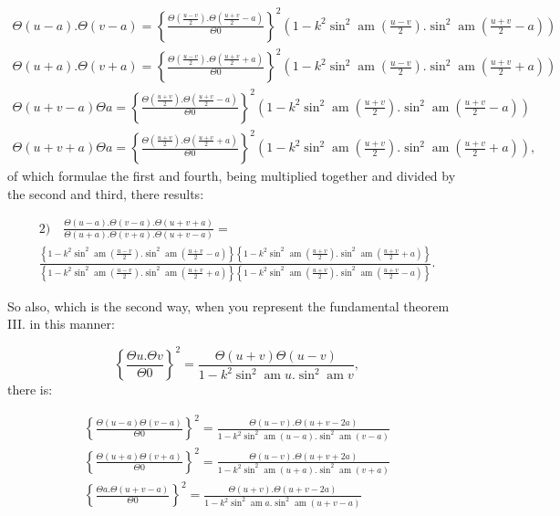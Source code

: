 \documentclass{article}
\begin{document}
\[
\begin{gathered}
\Theta(u-a).\Theta(v-a)=\left\{\frac{\Theta\left(\frac{u-v}{2}\right).\Theta\left(\frac{u+v}{2}-a\right)}{\Theta0}\right\}^{2}\left(1-k^{2}\sin^{2}\operatorname{am}\left(\frac{u-v}{2}\right).\sin^{2}\operatorname{am}\left(\frac{u+v}{2}-a\right)\right)\\[2ex]
\Theta(u+a).\Theta(v+a)=\left\{\frac{\Theta\left(\frac{u-v}{2}\right).\Theta\left(\frac{u+v}{2}+a\right)}{\Theta0}\right\}^{2}\left(1-k^{2}\sin^{2}\operatorname{am}\left(\frac{u-v}{2}\right).\sin^{2}\operatorname{am}\left(\frac{u+v}{2}+a\right)\right)\\[2ex]
\Theta(u+v-a)\Theta a=\left\{\frac{\Theta\left(\frac{u+v}{2}\right).\Theta\left(\frac{u+v}{2}-a\right)}{\Theta0}\right\}^{2}\left(1-k^{2}\sin^{2}\operatorname{am}\left(\frac{u+v}{2}\right).\sin^{2}\operatorname{am}\left(\frac{u+v}{2}-a\right)\right)\\[2ex]
\Theta(u+v+a)\Theta a=\left\{\frac{\Theta\left(\frac{u+v}{2}\right).\Theta\left(\frac{u+v}{2}+a\right)}{\Theta0}\right\}^{2}\left(1-k^{2}\sin^{2}\operatorname{am}\left(\frac{u+v}{2}\right).\sin^{2}\operatorname{am}\left(\frac{u+v}{2}+a\right)\right),
\end{gathered}
\]
of which formulae the first and fourth, being multiplied together and divided by the second and third, there results:

\[
\begin{gathered}
\text{2)}\quad \frac{\Theta(u-a).\Theta(v-a).\Theta(u+v+a)}{\Theta(u+a).\Theta(v+a).\Theta(u+v-a)}=\\[1.5ex]
\frac{\left\{1-k^{2}\sin^{2}\operatorname{am}\left(\frac{u-v}{2}\right).\sin^{2}\operatorname{am}\left(\frac{u+v}{2}-a\right)\right\}\left\{1-k^{2}\sin^{2}\operatorname{am}\left(\frac{u+v}{2}\right).\sin^{2}\operatorname{am}\left(\frac{u+v}{2}+a\right)\right\}}{\left\{1-k^{2}\sin^{2}\operatorname{am}\left(\frac{u-v}{2}\right).\sin^{2}\operatorname{am}\left(\frac{u+v}{2}+a\right)\right\}\left\{1-k^{2}\sin^{2}\operatorname{am}\left(\frac{u+v}{2}\right).\sin^{2}\operatorname{am}\left(\frac{u+v}{2}-a\right)\right\}}.
\end{gathered}
\]

So also, which is the second way, when you represent the fundamental theorem III. in this manner:

\[
\left\{\frac{\Theta u.\Theta v}{\Theta0}\right\}^{2}=\frac{\Theta(u+v)\Theta(u-v)}{1-k^{2}\sin^{2}\operatorname{am}u.\sin^{2}\operatorname{am}v},
\]
there is:

\[
\begin{gathered}
\left\{\frac{\Theta(u-a)\Theta(v-a)}{\Theta0}\right\}^{2}=\frac{\Theta(u-v).\Theta(u+v-2a)}{1-k^{2}\sin^{2}\operatorname{am}(u-a).\sin^{2}\operatorname{am}(v-a)}\\[2ex]
\left\{\frac{\Theta(u+a)\Theta(v+a)}{\Theta0}\right\}^{2}=\frac{\Theta(u-v).\Theta(u+v+2a)}{1-k^{2}\sin^{2}\operatorname{am}(u+a).\sin^{2}\operatorname{am}(v+a)}\\[2ex]
\left\{\frac{\Theta a.\Theta(u+v-a)}{\Theta0}\right\}^{2}=\frac{\Theta(u+v).\Theta(u+v-2a)}{1-k^{2}\sin^{2}\operatorname{am}a.\sin^{2}\operatorname{am}(u+v-a)}
\end{gathered}
\]
\end{document}
